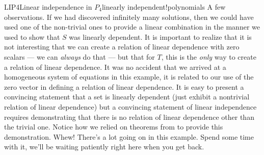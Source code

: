 \begin{example}{LIP4}{Linear independence in $P_4$}{linearly independent!polynomials}
A few observations.  If we had discovered infinitely many solutions, then we could have used one of the non-trivial ones to provide a linear combination in the manner we used to show that $S$ was linearly dependent.  It is important to realize that it is not interesting that we can create a relation of linear dependence with zero scalars --- we can {\em always} do that --- but that for $T$, this is the {\em only} way to create a relation of linear dependence.  It was no accident that we arrived at a homogeneous system of equations in this example, it is related to our use of the zero vector in defining a relation of linear dependence.  It is easy to present a convincing statement that a set is linearly dependent (just exhibit a nontrivial relation of linear dependence) but a convincing statement of linear independence requires demonstrating that there is no relation of linear dependence other than the trivial one.  Notice how we relied on theorems from  to provide this demonstration.  Whew!  There's a lot going on in this example.  Spend some time with it, we'll be waiting patiently right here when you get back.
\end{example}
%
%
